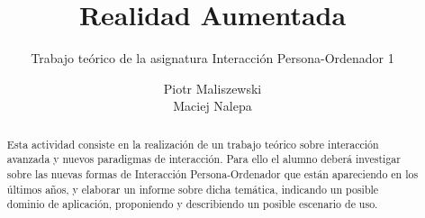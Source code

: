 \documentclass[a4paper,11pt]{scrartcl}
\title{Realidad Aumentada}
\subtitle{Trabajo teórico de la asignatura Interacción Persona-Ordenador 1}
\author{Piotr Maliszewski\\Maciej Nalepa}
\begin{document}
\maketitle

\begin{abstract}

Esta actividad consiste en la realización de un trabajo teórico sobre interacción avanzada y
nuevos paradigmas de interacción. Para ello el alumno deberá investigar sobre las nuevas
formas de Interacción Persona-Ordenador que están apareciendo en los últimos años, y elaborar un
informe sobre dicha temática, indicando un posible dominio de aplicación, proponiendo y
describiendo un posible escenario de uso.

\end{abstract}

\section{}
\end{document}
